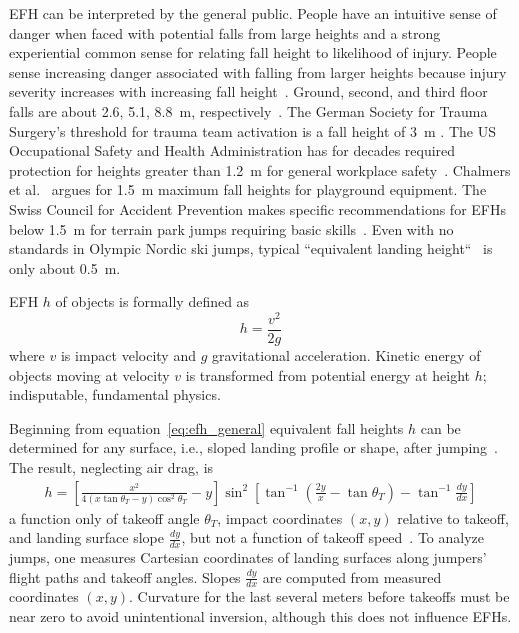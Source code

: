 \documentclass[smallextended]{svjour3}       %
\begin{document}
EFH can be interpreted by the general public. People have an intuitive sense of
danger when faced with potential falls from large heights and a strong
experiential common sense for relating fall height to likelihood of injury.
People sense increasing danger associated with falling from larger heights
because injury severity increases with increasing fall height~\cite{Nau2021}.
Ground, second, and third floor falls are about 2.6, 5.1, 8.8~\si{\meter},
respectively~\cite{Vish2005}. The German Society for Trauma Surgery's threshold
for trauma team activation is a fall height of 3~\si{\meter}
\cite{PolytraumaGuidelineUpdateGroup2018}. The US Occupational Safety and
Health Administration has for decades required protection for heights greater
than 1.2~\si{\meter} for general workplace safety~\cite{OSHA2021}.  Chalmers et
al.~\cite{Chalmers1996} argues for 1.5~\si{\meter} maximum fall heights for
playground equipment. The Swiss Council for Accident Prevention makes specific
recommendations for EFHs below 1.5~\si{\meter} for terrain park jumps requiring
basic skills~\cite{Heer2019}.  Even with no standards in Olympic Nordic ski
jumps, typical ``equivalent landing height``~\cite{Gasser2018} is only about
0.5~\si{\meter}.

EFH $h$ of objects is formally defined as
%
\begin{equation}
  h = \frac{v^2}{2g}
  \label{eq:efh_general}
\end{equation}
%
where $v$ is impact velocity and $g$ gravitational acceleration.  Kinetic
energy of objects moving at  velocity $v$  is transformed from potential energy
at height $h$; indisputable, fundamental physics.

Beginning from equation~\ref{eq:efh_general} equivalent fall heights $h$ can be
determined for any surface, i.e., sloped landing profile or shape, after
jumping~\cite{Petrone2017}. The result, neglecting air drag, is
%
\begin{align}
  h = \left[\frac{x^2}{4(x\tan\theta_T - y)\cos^{2}\theta_T} - y\right]
    \sin^{2}
    \left[\tan^{-1}\left(\frac{2y}{x} - \tan\theta_T\right) -
    \tan^{-1}\frac{dy}{dx}\right]
  \label{eq:efh}
\end{align}
%
a function only of takeoff angle $\theta_T$, impact coordinates $(x,y)$
relative to takeoff, and landing surface slope $\frac{dy}{dx}$, but not a
function of takeoff speed~\cite{Petrone2017}. To analyze jumps, one measures
Cartesian coordinates of landing surfaces along jumpers' flight paths and
takeoff angles. Slopes $\frac{dy}{dx}$ are computed from measured coordinates
$(x,y)$. Curvature for the last several meters before takeoffs must be near
zero to avoid unintentional inversion, although this does not influence EFHs.
\end{document}

